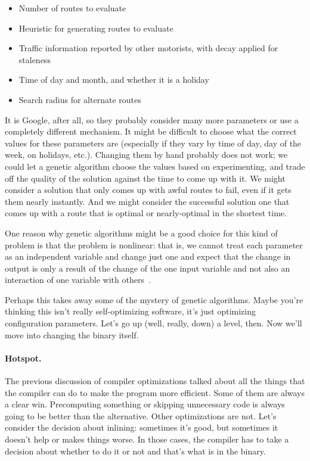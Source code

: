 \begin{itemize}
	\item Number of routes to evaluate
	\item Heuristic for generating routes to evaluate
	\item Traffic information reported by other motorists, with decay applied for staleness
	\item Time of day and month, and whether it is a holiday
	\item Search radius for alternate routes
\end{itemize}

It is Google, after all, so they probably consider many more parameters or use a completely different mechanism. It might be difficult to choose what the correct values for these parameters are (especially if they vary by time of day, day of the week, on holidays, etc.). Changing them by hand probably does not work; we could let a genetic algorithm choose the values based on experimenting, and trade off the quality of the solution against the time to come up with it. We might consider a solution that only comes up with awful routes to fail, even if it gets them nearly instantly. And we might consider the successful solution one that comes up with a route that is optimal or nearly-optimal in the shortest time.

One reason why genetic algorithms might be a good choice for this kind of problem is that the problem is nonlinear: that is, we cannot treat each parameter as an independent variable and change just one and expect that the change in output is only a result of the change of the one input variable and not also an interaction of one variable with others~\cite{genetic}.

Perhaps this takes away some of the mystery of genetic algorithms. Maybe you're thinking this isn't really self-optimizing software, it's just optimizing configuration parameters. Let's go up (well, really, down) a level, then. Now we'll move into changing the binary itself.

\paragraph{Hotspot.}
The previous discussion of compiler optimizations talked about all the things that the compiler can do to make the program more efficient. Some of them are always a clear win. Precomputing something or skipping unnecessary code is always going to be better than the alternative. Other optimizations are not. Let's consider the decision about inlining: sometimes it's good, but sometimes it doesn't help or makes things worse. In those cases, the compiler has to take a decision about whether to do it or not and that's what is in the binary.

